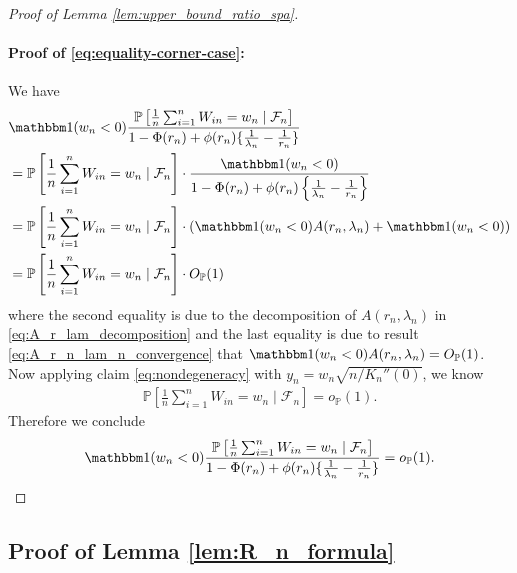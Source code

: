 \documentclass[12pt]{article}
\theoremstyle{definition}
\def\P{\mathbb{P}}
\def\P{\mathbb{P}}
\renewcommand{\P}{\mathbb{P}}							%
\newcommand{\indicator}{\mathbbm 1}						%
\begin{document}
\begin{proof}[Proof of Lemma \ref{lem:upper_bound_ratio_spa}]
	\paragraph{Proof of \eqref{eq:equality-corner-case}:}
	We have 
	\begin{align*}
		&
		\indicator(w_n < 0)\frac{\P\left[\frac1n \sum_{i = 1}^n W_{in} = w_n \mid \mathcal F_n\right]}{1-\Phi(r_n)+\phi(r_n)\{\frac{1}{\lambda_n}-\frac{1}{r_n}\}}\\
		&
		= \P\left[\frac1n \sum_{i = 1}^n W_{in} = w_n \mid \mathcal F_n\right]\cdot \frac{\indicator(w_n<0)}{1 - \Phi(r_n)+\phi(r_n)\left\{\frac{1}{\lambda_n}-\frac{1}{r_n}\right\}}\\
		&
		=\P\left[\frac1n \sum_{i = 1}^n W_{in} = w_n \mid \mathcal F_n\right]\cdot \left(\indicator(w_n<0)A(r_n,\lambda_n)+\indicator(w_n<0)\right)\\
		&
		=\P\left[\frac1n \sum_{i = 1}^n W_{in} = w_n \mid \mathcal F_n\right]\cdot O_{\P}(1)
	\end{align*}
	where the second equality is due to the decomposition of $A(r_n,\lambda_n)$ in \eqref{eq:A_r_lam_decomposition} and the last equality is due to result \eqref{eq:A_r_n_lam_n_convergence} that $\indicator(w_n<0)A(r_n,\lambda_n)=O_\P(1)$. Now applying claim \eqref{eq:nondegeneracy} with $y_n=w_n \sqrt{n/K_n''(0)}$, we know 
	\begin{align*}
		\P\left[\frac1n \sum_{i = 1}^n W_{in} = w_n \mid \mathcal F_n\right]=o_\P(1).
	\end{align*}
	Therefore we conclude 
	\begin{align*}
		\indicator(w_n < 0)\frac{\P\left[\frac1n \sum_{i = 1}^n W_{in} = w_n \mid \mathcal F_n\right]}{1-\Phi(r_n)+\phi(r_n)\{\frac{1}{\lambda_n}-\frac{1}{r_n}\}}=o_\P(1).
	\end{align*}
\end{proof}




\subsection{Proof of Lemma \ref{lem:R_n_formula}}
\end{document}
